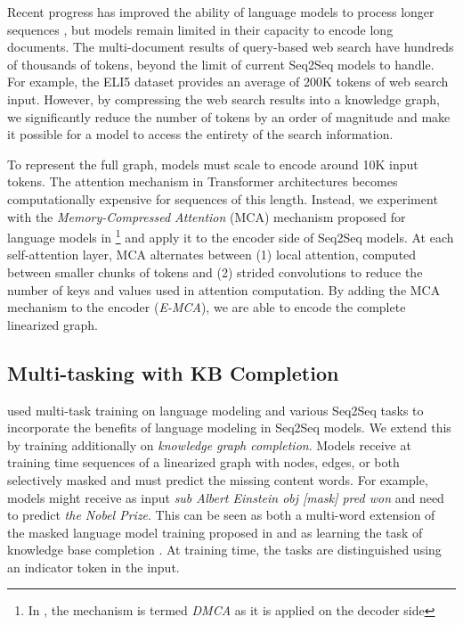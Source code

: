 \documentclass[11pt,a4paper]{article}
\begin{document}
Recent progress has improved the ability of language models to process longer sequences \cite{sukhbaatar2019adaptive,dai2019transformer}, but models remain limited in their capacity to encode long documents. The multi-document results of query-based web search have hundreds of thousands of tokens, beyond the limit of current Seq2Seq models to handle. For example, the ELI5 dataset provides an average of 200K tokens of web search input. However, by compressing the web search results into a knowledge graph, we significantly reduce the number of tokens by an order of magnitude and make it possible for a model to access the entirety of the search information.

To represent the full graph, models must scale to encode around 10K input tokens. The attention mechanism in Transformer architectures becomes  computationally expensive for sequences of this length. Instead, we experiment with the \textit{Memory-Compressed Attention} (MCA) mechanism proposed for language models in \cite{liu2018generating}\footnote{In \cite{liu2018generating}, the mechanism is termed \textit{DMCA} as it is applied on the decoder side} and apply it to the encoder side of Seq2Seq models. At each self-attention layer, MCA alternates between (1) local attention, computed between smaller chunks of tokens and (2) strided convolutions to reduce the number of keys and values used in attention computation. By adding the MCA mechanism to the encoder (\textit{E-MCA}), we are able to encode the complete linearized graph.

\subsection{Multi-tasking with KB Completion} \citet{fan2019explain} used multi-task training on language modeling and various Seq2Seq tasks to incorporate the benefits of language modeling in Seq2Seq models. We extend this by training additionally on \textit{knowledge graph completion}. Models receive at training time sequences of a linearized graph with nodes, edges, or both selectively masked and must predict the missing content words. For example, models might receive as input \textit{sub Albert Einstein obj [mask] pred won} and need to predict \textit{the Nobel Prize}. This can be seen as both a multi-word extension of the masked language model training proposed in \cite{devlin2018bert} and as learning the task of knowledge base completion \cite{lacroix2018canonical,bordes2011learning}. At training time, the tasks are distinguished using an indicator token in the input. 
\end{document}
